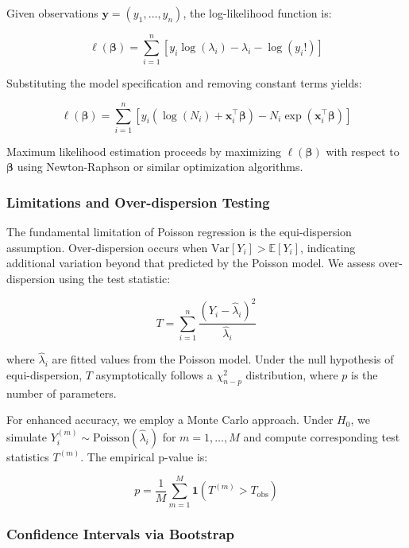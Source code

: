 \documentclass[11pt]{article}
\begin{document}
Given observations $\mathbf{y} = (y_1, \ldots, y_n)$, the log-likelihood function is:

\begin{equation}
\ell(\boldsymbol{\beta}) = \sum_{i=1}^n \left[ y_i \log(\lambda_i) - \lambda_i - \log(y_i!) \right]
\end{equation}

Substituting the model specification and removing constant terms yields:

\begin{equation}
\ell(\boldsymbol{\beta}) = \sum_{i=1}^n \left[ y_i (\log(N_i) + \mathbf{x}_i^\top \boldsymbol{\beta}) - N_i \exp(\mathbf{x}_i^\top \boldsymbol{\beta}) \right]
\end{equation}

Maximum likelihood estimation proceeds by maximizing $\ell(\boldsymbol{\beta})$ with respect to $\boldsymbol{\beta}$ using Newton-Raphson or similar optimization algorithms.

\subsubsection{Limitations and Over-dispersion Testing}

The fundamental limitation of Poisson regression is the equi-dispersion assumption. Over-dispersion occurs when $\text{Var}[Y_i] > \mathbb{E}[Y_i]$, indicating additional variation beyond that predicted by the Poisson model. We assess over-dispersion using the test statistic:

\begin{equation}
T = \sum_{i=1}^n \frac{(Y_i - \hat{\lambda}_i)^2}{\hat{\lambda}_i}
\end{equation}

where $\hat{\lambda}_i$ are fitted values from the Poisson model. Under the null hypothesis of equi-dispersion, $T$ asymptotically follows a $\chi^2_{n-p}$ distribution, where $p$ is the number of parameters.

For enhanced accuracy, we employ a Monte Carlo approach. Under $H_0$, we simulate $Y_i^{(m)} \sim \text{Poisson}(\hat{\lambda}_i)$ for $m = 1, \ldots, M$ and compute corresponding test statistics $T^{(m)}$. The empirical p-value is:

\begin{equation}
p = \frac{1}{M} \sum_{m=1}^M \mathbf{1}(T^{(m)} > T_{\text{obs}})
\end{equation}

\subsubsection{Confidence Intervals via Bootstrap}
\end{document}
